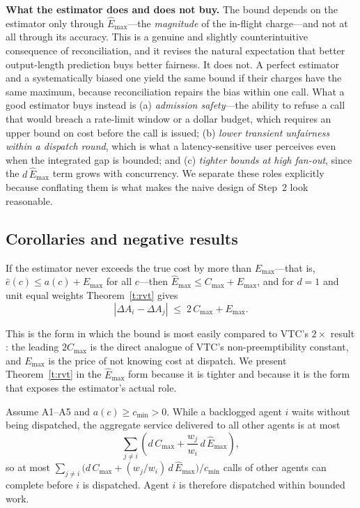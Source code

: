 \documentclass[letterpaper,11pt,leqno]{article}
\begin{document}
\textbf{What the estimator does and does not buy.} The bound depends on the estimator only through $\hat{E}_{\max}$---the \emph{magnitude} of the in-flight charge---and not at all through its accuracy. This is a genuine and slightly counterintuitive consequence of reconciliation, and it revises the natural expectation that better output-length prediction buys better fairness. It does not. A perfect estimator and a systematically biased one yield the same bound if their charges have the same maximum, because reconciliation repairs the bias within one call. What a good estimator buys instead is (a) \emph{admission safety}---the ability to refuse a call that would breach a rate-limit window or a dollar budget, which requires an upper bound on cost before the call is issued; (b) \emph{lower transient unfairness within a dispatch round}, which is what a latency-sensitive user perceives even when the integrated gap is bounded; and (c) \emph{tighter bounds at high fan-out}, since the $d\,\hat{E}_{\max}$ term grows with concurrency. We separate these roles explicitly because conflating them is what makes the naive design of Step~2 look reasonable.

\subsection{Corollaries and negative results}\label{s:corollaries}

\begin{corollary}\label{c:estimator}
If the estimator never exceeds the true cost by more than $E_{\max}$---that is, $\hat{e}(c) \le a(c) + E_{\max}$ for all $c$---then $\hat{E}_{\max} \le C_{\max} + E_{\max}$, and for $d = 1$ and unit equal weights Theorem~\ref{t:rvt} gives
\[
  \left|\Delta A_i - \Delta A_j\right| \;\le\; 2\,C_{\max} + E_{\max}.
\]
\end{corollary}

This is the form in which the bound is most easily compared to VTC's $2\times$ result \citep{Sheng24}: the leading $2C_{\max}$ is the direct analogue of VTC's non-preemptibility constant, and $E_{\max}$ is the price of not knowing cost at dispatch. We present Theorem~\ref{t:rvt} in the $\hat{E}_{\max}$ form because it is tighter and because it is the form that exposes the estimator's actual role.

\begin{corollary}\label{c:starvation}
Assume A1--A5 and $a(c) \ge c_{\min} > 0$. While a backlogged agent $i$ waits without being dispatched, the aggregate service delivered to all other agents is at most
\[
  \sum_{j \ne i} \left( d\,C_{\max} + \frac{w_j}{w_i}\, d\,\hat{E}_{\max} \right),
\]
so at most $\sum_{j \ne i} \bigl(d\,C_{\max} + (w_j/w_i)\,d\,\hat{E}_{\max}\bigr) / c_{\min}$ calls of other agents can complete before $i$ is dispatched. Agent $i$ is therefore dispatched within bounded work.
\end{corollary}
\end{document}
